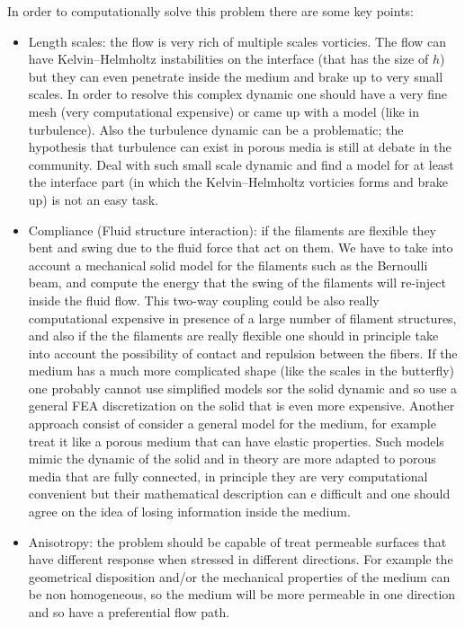 In order to computationally solve this problem there are some key points:
\begin{itemize}
	\item Length scales: the flow is very rich of multiple scales vorticies. The flow can have Kelvin–Helmholtz instabilities on the interface (that has the size of $h$) but they can even penetrate inside the medium and brake up to very small scales. In order to resolve this complex dynamic one should have a very fine mesh (very computational expensive) or came up with a model (like in turbulence).
	Also the turbulence dynamic can be a problematic; the hypothesis that turbulence can exist in porous media is still at debate in the community.
	Deal with such small scale dynamic and find a model for at least the interface part (in which the Kelvin–Helmholtz vorticies forms and brake up) is not an easy task.
	
	\item Compliance (Fluid structure interaction): if the filaments are flexible they bent and swing due to the fluid force that act on them.
	We have to take into account a mechanical solid model for the filaments such as the Bernoulli beam, and compute the energy that the swing of the filaments will re-inject inside the fluid flow.
	This two-way coupling could be also really computational expensive in presence of a large number of filament structures, and also if the the filaments are really flexible one should in principle take into account the possibility of contact and repulsion between the fibers.
	If the medium has a much more complicated shape (like the scales in the butterfly) one probably cannot use simplified models sor the solid dynamic and so use a general FEA discretization on the solid that is even more expensive.
	Another approach consist of consider a general model for the medium, for example treat it like a porous medium that can have elastic properties.
	Such models mimic the dynamic of the solid and in theory are more adapted to porous media that are fully connected, in principle they are very computational convenient but their mathematical description can e difficult and one should agree on the idea of losing information inside the medium.
	
	\item Anisotropy: the problem should be capable of treat permeable surfaces that have different response when stressed in different directions. For example the geometrical disposition and/or the mechanical properties of the medium can be non homogeneous, so the medium will be more permeable in one direction and so have a preferential flow path.
\end{itemize}

